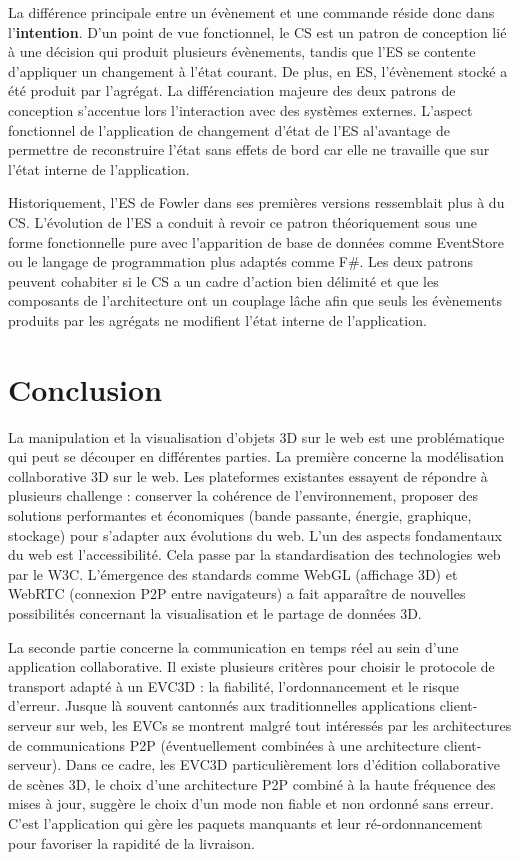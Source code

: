 La différence principale entre un évènement et une commande réside donc dans 
l'\textbf{intention}. D'un point de vue fonctionnel, le \gls{CS} est un patron de 
conception lié à une décision qui produit plusieurs évènements, tandis que 
l'\gls{ES} se contente d'appliquer un changement à l'état courant. De plus, en 
\gls{ES}, l'évènement stocké a été produit par l'agrégat. 
La différenciation majeure des deux patrons de conception s'accentue lors 
l'interaction avec des systèmes externes. L'aspect fonctionnel de l'application de 
changement d'état de l'\gls{ES} al'avantage de permettre de reconstruire l'état sans 
effets de bord car elle ne travaille que sur l'état interne de l'application. 

Historiquement, l'\gls{ES} de Fowler dans ses premières versions ressemblait plus 
à du \gls{CS}. L'évolution de l'\gls{ES} a conduit à revoir ce patron théoriquement 
sous une forme fonctionnelle pure avec l'apparition de base de données comme 
EventStore ou le langage de programmation plus adaptés comme F\#. Les deux 
patrons peuvent cohabiter si le \gls{CS} a un cadre d'action bien délimité 
et que les composants de l'architecture ont un couplage lâche afin que seuls les 
évènements produits par les agrégats ne modifient l'état interne de l'application. 

\section{Conclusion}

La manipulation et la visualisation d'objets 3D sur le web est une problématique 
qui peut se découper en différentes parties.
La première concerne la modélisation collaborative 3D sur le web. Les plateformes 
existantes essayent de répondre à plusieurs challenge : conserver la cohérence 
de l'environnement, proposer des solutions performantes et économiques (bande 
passante, énergie, graphique, stockage)  pour s'adapter aux évolutions du web.
L'un des aspects fondamentaux du web est l'accessibilité. Cela passe par la 
standardisation des technologies web par le \gls{W3C}.  L'émergence des 
standards comme WebGL (affichage 3D) et WebRTC (connexion P2P entre 
navigateurs) a fait apparaître de nouvelles possibilités concernant la visualisation 
et le partage de données 3D. 


La seconde partie concerne la communication en temps réel au sein d'une 
application collaborative. Il existe plusieurs critères pour choisir le protocole de 
transport adapté à un \gls{EVC3D} : la fiabilité, l'ordonnancement et le risque 
d'erreur. 
Jusque là souvent cantonnés aux traditionnelles 
applications client-serveur sur web, les \glspl{EVC} se montrent malgré tout 
intéressés par les architectures de communications P2P (éventuellement 
combinées à une architecture client-serveur). Dans ce cadre, les \gls{EVC3D} 
particulièrement lors d'édition collaborative de scènes 3D, le choix d'une 
architecture \gls{P2P} combiné à la haute fréquence des mises à jour, suggère le 
choix d'un mode non fiable et non ordonné sans erreur. C'est l'application qui gère 
les 
paquets manquants et leur ré-ordonnancement pour favoriser la rapidité 
de la livraison.

